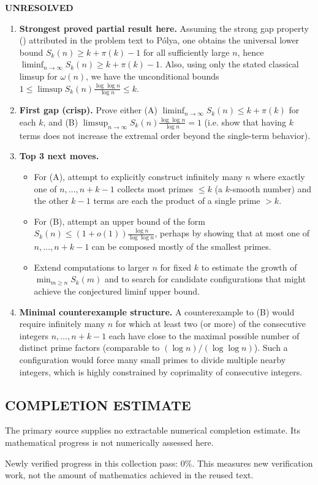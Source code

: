 \noindent \textbf{UNRESOLVED}
\begin{enumerate}
\item[(i)] \textbf{Strongest proved partial result here.} Assuming the strong gap property (\*) attributed in the problem text to P\'{o}lya, one obtains the universal lower bound $S_k(n)\ge k+\pi(k)-1$ for all sufficiently large $n$, hence $\liminf_{n\to\infty} S_k(n)\ge k+\pi(k)-1$. Also, using only the stated classical limsup for $\omega(n)$, we have the unconditional bounds $1\le \limsup S_k(n)\frac{\log\log n}{\log n}\le k$.
\item[(ii)] \textbf{First gap (crisp).} Prove either (A) $\liminf_{n\to\infty} S_k(n)\le k+\pi(k)$ for each $k$, and (B) $\limsup_{n\to\infty} S_k(n)\frac{\log\log n}{\log n}=1$ (i.e. show that having $k$ terms does not increase the extremal order beyond the single-term behavior).
\item[(iii)] \textbf{Top 3 next moves.}
  \begin{itemize}
  \item For (A), attempt to explicitly construct infinitely many $n$ where exactly one of $n,\dots,n+k-1$ collects most primes $\le k$ (a $k$-smooth number) and the other $k-1$ terms are each the product of a single prime $>k$.
  \item For (B), attempt an upper bound of the form $S_k(n)\le (1+o(1))\frac{\log n}{\log\log n}$, perhaps by showing that at most one of $n,\dots,n+k-1$ can be composed mostly of the smallest primes.
  \item Extend computations to larger $n$ for fixed $k$ to estimate the growth of $\min_{m\ge n} S_k(m)$ and to search for candidate configurations that might achieve the conjectured liminf upper bound.
  \end{itemize}
\item[(iv)] \textbf{Minimal counterexample structure.} A counterexample to (B) would require infinitely many $n$ for which at least two (or more) of the consecutive integers $n,\dots,n+k-1$ each have close to the maximal possible number of distinct prime factors (comparable to $(\log n)/(\log\log n)$). Such a configuration would force many small primes to divide multiple nearby integers, which is highly constrained by coprimality of consecutive integers.
\end{enumerate}



\subsection*{COMPLETION ESTIMATE}
The primary source supplies no extractable numerical completion estimate. Its mathematical progress is not numerically assessed here.

Newly verified progress in this collection pass: $0\%$. This measures new verification work, not the amount of mathematics achieved in the reused text.
